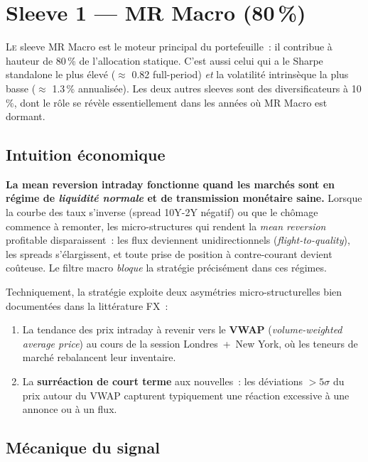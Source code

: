 \section{Sleeve 1 --- MR Macro (80\,\%)}
\label{sec:mr_macro}

\lettrine[lines=2, findent=2pt, nindent=0pt]{L}{e} sleeve MR Macro est le moteur principal du portefeuille~: il contribue à hauteur de 80\,\% de l'allocation statique. C'est aussi celui qui a le Sharpe standalone le plus élevé ($\approx$ 0.82 full-period) \emph{et} la volatilité intrinsèque la plus basse ($\approx$ 1.3\,\% annualisée). Les deux autres sleeves sont des diversificateurs à 10\,\%, dont le rôle se révèle essentiellement dans les années où MR Macro est dormant.

\subsection{Intuition économique}

\begin{thesisbox}
\textbf{La mean reversion intraday fonctionne quand les marchés sont en régime de \emph{liquidité normale} et de transmission monétaire saine.} Lorsque la courbe des taux s'inverse (spread 10Y-2Y négatif) ou que le chômage commence à remonter, les micro-structures qui rendent la \emph{mean reversion} profitable disparaissent~: les flux deviennent unidirectionnels (\emph{flight-to-quality}), les spreads s'élargissent, et toute prise de position à contre-courant devient coûteuse. Le filtre macro \emph{bloque} la stratégie précisément dans ces régimes.
\end{thesisbox}

Techniquement, la stratégie exploite deux asymétries micro-structurelles bien documentées dans la littérature FX~:
\begin{enumerate}
\item La tendance des prix intraday à revenir vers le \textbf{VWAP} (\emph{volume-weighted average price}) au cours de la session Londres~+~New York, où les teneurs de marché rebalancent leur inventaire.
\item La \textbf{surréaction de court terme} aux nouvelles~: les déviations $>5\sigma$ du prix autour du VWAP capturent typiquement une réaction excessive à une annonce ou à un flux.
\end{enumerate}

\subsection{Mécanique du signal}

